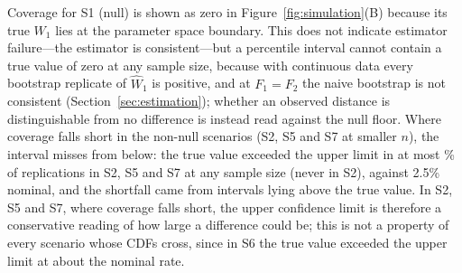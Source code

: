 \documentclass[AMA,Times1COL]{WileyNJDv5}
\begin{document}
Coverage for S1 (null) is shown as zero in Figure~\ref{fig:simulation}(B) because its true $W_1$ lies at the parameter space boundary. This does not indicate estimator failure---the estimator is consistent---but a percentile interval cannot contain a true value of zero at any sample size, because with continuous data every bootstrap replicate of $\widehat{W}_1$ is positive, and at $F_1 = F_2$ the naive bootstrap is not consistent (Section~\ref{sec:estimation}); whether an observed distance is distinguishable from no difference is instead read against the null floor. Where coverage falls short in the non-null scenarios (S2, S5 and S7 at smaller $n$), the interval misses from below: the true value exceeded the upper limit in at most \% of replications in S2, S5 and S7 at any sample size (never in S2), against 2.5\% nominal, and the shortfall came from intervals lying above the true value. In S2, S5 and S7, where coverage falls short, the upper confidence limit is therefore a conservative reading of how large a difference could be; this is not a property of every scenario whose CDFs cross, since in S6 the true value exceeded the upper limit at about the nominal rate.
\end{document}
